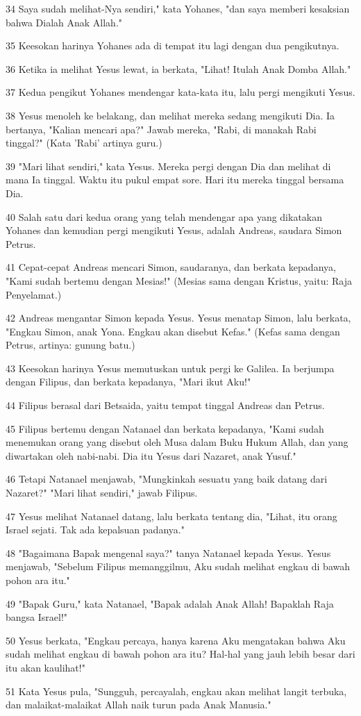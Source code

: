 \par 34 Saya sudah melihat-Nya sendiri," kata Yohanes, "dan saya memberi kesaksian bahwa Dialah Anak Allah."
\par 35 Keesokan harinya Yohanes ada di tempat itu lagi dengan dua pengikutnya.
\par 36 Ketika ia melihat Yesus lewat, ia berkata, "Lihat! Itulah Anak Domba Allah."
\par 37 Kedua pengikut Yohanes mendengar kata-kata itu, lalu pergi mengikuti Yesus.
\par 38 Yesus menoleh ke belakang, dan melihat mereka sedang mengikuti Dia. Ia bertanya, "Kalian mencari apa?" Jawab mereka, "Rabi, di manakah Rabi tinggal?" (Kata 'Rabi' artinya guru.)
\par 39 "Mari lihat sendiri," kata Yesus. Mereka pergi dengan Dia dan melihat di mana Ia tinggal. Waktu itu pukul empat sore. Hari itu mereka tinggal bersama Dia.
\par 40 Salah satu dari kedua orang yang telah mendengar apa yang dikatakan Yohanes dan kemudian pergi mengikuti Yesus, adalah Andreas, saudara Simon Petrus.
\par 41 Cepat-cepat Andreas mencari Simon, saudaranya, dan berkata kepadanya, "Kami sudah bertemu dengan Mesias!" (Mesias sama dengan Kristus, yaitu: Raja Penyelamat.)
\par 42 Andreas mengantar Simon kepada Yesus. Yesus menatap Simon, lalu berkata, "Engkau Simon, anak Yona. Engkau akan disebut Kefas." (Kefas sama dengan Petrus, artinya: gunung batu.)
\par 43 Keesokan harinya Yesus memutuskan untuk pergi ke Galilea. Ia berjumpa dengan Filipus, dan berkata kepadanya, "Mari ikut Aku!"
\par 44 Filipus berasal dari Betsaida, yaitu tempat tinggal Andreas dan Petrus.
\par 45 Filipus bertemu dengan Natanael dan berkata kepadanya, "Kami sudah menemukan orang yang disebut oleh Musa dalam Buku Hukum Allah, dan yang diwartakan oleh nabi-nabi. Dia itu Yesus dari Nazaret, anak Yusuf."
\par 46 Tetapi Natanael menjawab, "Mungkinkah sesuatu yang baik datang dari Nazaret?" "Mari lihat sendiri," jawab Filipus.
\par 47 Yesus melihat Natanael datang, lalu berkata tentang dia, "Lihat, itu orang Israel sejati. Tak ada kepalsuan padanya."
\par 48 "Bagaimana Bapak mengenal saya?" tanya Natanael kepada Yesus. Yesus menjawab, "Sebelum Filipus memanggilmu, Aku sudah melihat engkau di bawah pohon ara itu."
\par 49 "Bapak Guru," kata Natanael, "Bapak adalah Anak Allah! Bapaklah Raja bangsa Israel!"
\par 50 Yesus berkata, "Engkau percaya, hanya karena Aku mengatakan bahwa Aku sudah melihat engkau di bawah pohon ara itu? Hal-hal yang jauh lebih besar dari itu akan kaulihat!"
\par 51 Kata Yesus pula, "Sungguh, percayalah, engkau akan melihat langit terbuka, dan malaikat-malaikat Allah naik turun pada Anak Manusia."

